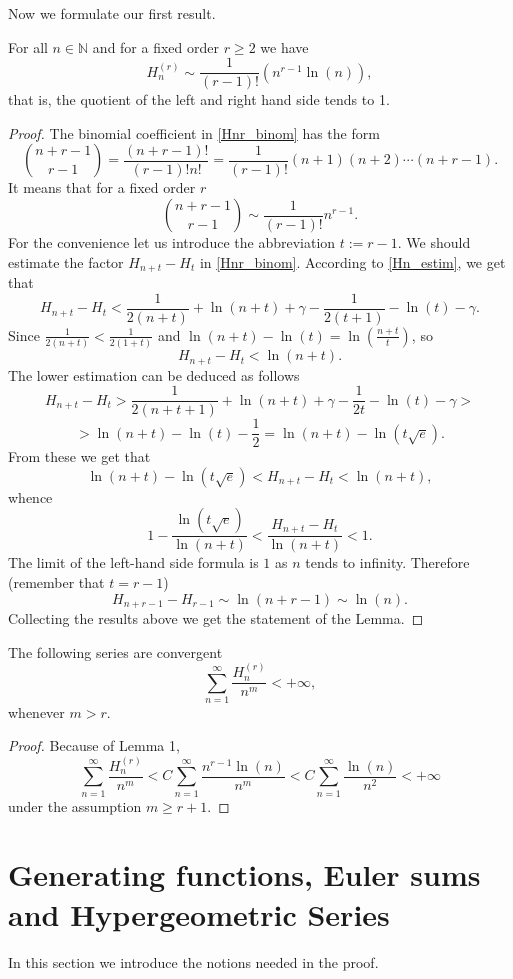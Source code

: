\documentclass[a4paper,12pt]{amsart}
\begin{document}
Now we formulate our first result.
\begin{Lemma}For all $n\in{\mathbb{N}}$ and for a fixed order $r\ge 2$ we have
\[H_n^{(r)}\sim\frac{1}{(r-1)!}\left(n^{r-1}\ln(n)\right),\]
that is, the quotient of the left and right hand side tends to 1.
\end{Lemma}

\begin{proof}The binomial coefficient in \eqref{Hnr_binom} has the form
\[\binom{n+r-1}{r-1}=\frac{(n+r-1)!}{(r-1)!n!}=\frac{1}{(r-1)!}(n+1)(n+2)\cdots(n+r-1).\]
It means that for a fixed order $r$
\[\binom{n+r-1}{r-1}\sim\frac{1}{(r-1)!}n^{r-1}.\]
For the convenience let us introduce the abbreviation $t:=r-1$. We should estimate the factor $H_{n+t}-H_t$ in \eqref{Hnr_binom}. According to \eqref{Hn_estim}, we get that
\[H_{n+t}-H_t<\frac{1}{2(n+t)}+\ln(n+t)+\gamma-\frac{1}{2(t+1)}-\ln(t)-\gamma.\]
Since $\frac{1}{2(n+t)}<\frac{1}{2(1+t)}$ and $\ln(n+t)-\ln(t)=\ln\left(\frac{n+t}{t}\right)$, so
\[H_{n+t}-H_t<\ln(n+t).\]
The lower estimation can be deduced as follows
\[H_{n+t}-H_t>\frac{1}{2(n+t+1)}+\ln(n+t)+\gamma-\frac{1}{2t}-\ln(t)-\gamma>\]
\[>\ln(n+t)-\ln(t)-\frac{1}{2}=\ln(n+t)-\ln(t\sqrt{e}).\]
From these we get that
\[\ln(n+t)-\ln(t\sqrt{e})<H_{n+t}-H_t<\ln(n+t),\]
whence
\[1-\frac{\ln(t\sqrt{e})}{\ln(n+t)}<\frac{H_{n+t}-H_t}{\ln(n+t)}<1.\]
The limit of the left-hand side formula is $1$ as $n$ tends to infinity. Therefore (remember that $t=r-1$)
\[H_{n+r-1}-H_{r-1}\sim\ln(n+r-1)\sim\ln(n).\]
Collecting the results above we get the statement of the Lemma.
\end{proof}

\begin{Corollary}The following series are convergent
\[\sum_{n=1}^\infty\frac{H_n^{(r)}}{n^m}<+\infty,\]
whenever $m>r$.
\end{Corollary}

\begin{proof}Because of Lemma 1,
\[\sum_{n=1}^\infty\frac{H_n^{(r)}}{n^m}<C\sum_{n=1}^\infty\frac{n^{r-1}\ln(n)}{n^m}<C\sum_{n=1}^\infty\frac{\ln(n)}{n^2}<+\infty\]
under the assumption $m\ge r+1$.
\end{proof}

\section{Generating functions, Euler sums and Hypergeometric Series}
In this section we introduce the notions needed in the proof.
\end{document}
